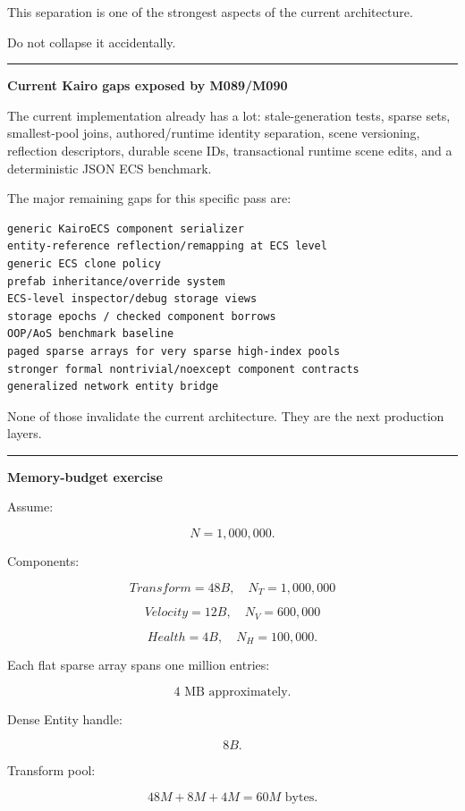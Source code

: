 This separation is one of the strongest aspects of the current architecture.

Do not collapse it accidentally.

\begin{center}\rule{0.5\linewidth}{0.5pt}\end{center}

\textbf{Current Kairo gaps exposed by M089/M090}

The current implementation already has a lot: stale-generation tests, sparse sets, smallest-pool joins, authored/runtime identity separation, scene versioning, reflection descriptors, durable scene IDs, transactional runtime scene edits, and a deterministic JSON ECS benchmark.

The major remaining gaps for this specific pass are:

\begin{verbatim}
generic KairoECS component serializer
entity-reference reflection/remapping at ECS level
generic ECS clone policy
prefab inheritance/override system
ECS-level inspector/debug storage views
storage epochs / checked component borrows
OOP/AoS benchmark baseline
paged sparse arrays for very sparse high-index pools
stronger formal nontrivial/noexcept component contracts
generalized network entity bridge
\end{verbatim}

None of those invalidate the current architecture. They are the next production layers.

\begin{center}\rule{0.5\linewidth}{0.5pt}\end{center}

\textbf{Memory-budget exercise}

Assume:

\[
N=1,000,000.
\]

Components:

\[
Transform=48B,\quad N_T=1,000,000
\]

\[
Velocity=12B,\quad N_V=600,000
\]

\[
Health=4B,\quad N_H=100,000.
\]

Each flat sparse array spans one million entries:

\[
4\text{ MB approximately}.
\]

Dense Entity handle:

\[
8B.
\]

Transform pool:

\[
48M+8M+4M
=
60M\text{ bytes}.
\]

